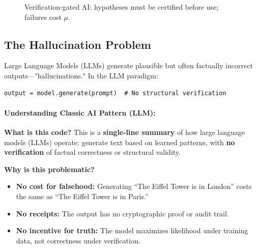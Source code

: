 \begin{figure}[h]
\centering
{}
\caption{Verification-gated AI: hypotheses must be certified before use; failures cost $\mu$.}
\label{fig:ai-verification}
\end{figure}

\subsection{The Hallucination Problem}

Large Language Models (LLMs) generate plausible but often factually incorrect outputs—"hallucinations." In the LLM paradigm:
\begin{lstlisting}
output = model.generate(prompt)  # No structural verification
\end{lstlisting}

\paragraph{Understanding Classic AI Pattern (LLM):}

\textbf{What is this code?} This is a \textbf{single-line summary} of how large language models (LLMs) operate: generate text based on learned patterns, with \textbf{no verification} of factual correctness or structural validity.

\textbf{Why is this problematic?}
\begin{itemize}
    \item \textbf{No cost for falsehood:} Generating ``The Eiffel Tower is in London'' costs the same as ``The Eiffel Tower is in Paris.''
    \item \textbf{No receipts:} The output has no cryptographic proof or audit trail.
    \item \textbf{No incentive for truth:} The model maximizes likelihood under training data, not correctness under verification.
\end{itemize}

